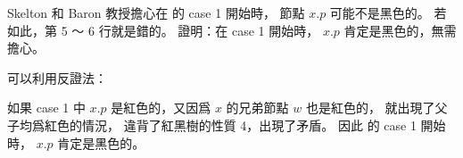 \startEXERCISE
Skelton 和 Baron 教授擔心在  的 case 1 開始時，
節點 $x.p$ 可能不是黑色的。
若如此，第 5 ～ 6 行就是錯的。
證明：在 case 1 開始時， $x.p$ 肯定是黑色的，無需擔心。
\stopEXERCISE

\startANSWER
可以利用反證法：

如果 case 1 中 $x.p$ 是紅色的，又因爲 $x$ 的兄弟節點 $w$ 也是紅色的，
就出現了父子均爲紅色的情況，
違背了紅黑樹的性質 4，出現了矛盾。
因此  的 case 1 開始時，
 $x.p$ 肯定是黑色的。
\stopANSWER
